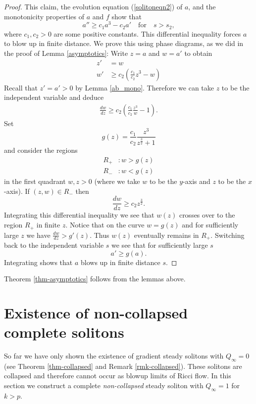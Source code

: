 \documentclass{amsart}
\theoremstyle{definition}
\theoremstyle{remark}
\numberwithin{equation}{section}
\begin{document}
\begin{proof}
This claim, the evolution equation (\ref{solitoneqn2}) of $a$, and the monotonicity properties of $a$ and $f$ show that 
\begin{equation*}
a'' \geq c_1 a^3 - c_2 a' \quad \text{for} \quad s > s_2,
\end{equation*}
where $c_1, c_2>0$ are some positive constants. This differential inequality forces $a$ to blow up in finite distance. We prove this using phase diagrams, as we did in the proof of Lemma \ref{asymptotics}: Write $z = a$ and $w = a'$ to obtain
\begin{align*}
z' &= w \\
w' &\geq c_2 \left( \frac{c_1}{c_2} z^3 - w\right) 
\end{align*}
Recall that $z' = a' > 0$ by Lemma \ref{ab_mono}. Therefore we can take $z$ to be the independent variable and deduce
\begin{align*}
\frac{dw}{dz} \geq c_2 \left( \frac{c_1}{c_2} \frac{z^3}{w} - 1\right).
\end{align*}
Set
\begin{equation*}
g(z) = \frac{c_1}{c_2} \frac{z^3}{z^{\frac{3}{2}}+1}
\end{equation*}
and consider the regions
\begin{align*}
 R_+&: w > g(z) \\
 R_-&: w < g(z)
 \end{align*}
 in the first quadrant $w, z > 0$ (where we take $w$ to be the $y$-axis and $z$ to be the $x$-axis). If $(z, w) \in R_-$ then
\begin{equation*}
\frac{dw}{dz} \geq c_2 z^{\frac{3}{2}}.
\end{equation*}
Integrating this differential inequality we see that $w(z)$ crosses over to the region $R_+$ in finite $z$. Notice that
on the curve $w = g(z)$ and for sufficiently large $z$ we have $\frac{dw}{dz} > g'(z)$. Thus $w(z)$ eventually remains in $R_+$. Switching back to the independent variable $s$ we see that for sufficiently large $s$
\begin{equation*}
a' \geq g(a).
\end{equation*}
Integrating shows that $a$ blows up in finite distance $s$.
\end{proof}

Theorem \ref{thm-asymptotics} follows from the lemmas above.

\section{Existence of non-collapsed complete solitons}
\label{section_existence}
So far we have only shown the existence of gradient steady solitons with $Q_{\infty} = 0$ (see Theorem \ref{thm-collapsed} and Remark \ref{rmk-collapsed}). These solitons are collapsed and therefore cannot occur as blowup limits of Ricci flow. In this section we construct a complete \emph{non-collapsed} steady soliton with $Q_{\infty} =1$ for $k>p$.
\end{document}
